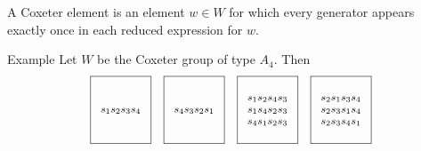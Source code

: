 \documentclass[9pt,handout]{beamer}
\begin{document}
\begin{frame}
\begin{definition} A \alert{Coxeter element} is an element $w \in W$ for which every generator appears exactly once in each reduced expression for $w$.
\end{definition}
    \pause
\begin{block}{Example} Let $W$ be the Coxeter group of type $A_4$. Then  
%    
%         
%         
%         
$${\footnotesize \begin{array}{cccc}
    \boxed{\begin{array}{c} \\ \\ s_1s_2s_3s_4 \\ \\ \\\end{array}} &
    \boxed{\begin{array}{c} \\ \\ s_4s_3s_2s_1 \\ \\ \\\end{array}} & 
    \boxed{\begin{array}{c} \\ s_1s_2s_4s_3 \\ s_1s_4s_2s_3 \\ s_4s_1s_2s_3 \\ \\ \end{array}} & 
    \boxed{\begin{array}{c} \\ s_2s_1s_3s_4 \\ s_2s_3s_1s_4 \\ s_2s_3s_4s_1 \\ \\ \end{array}} \\ &&& \\

\end{array}}$$
\end{block}
\end{frame}
\end{document}
